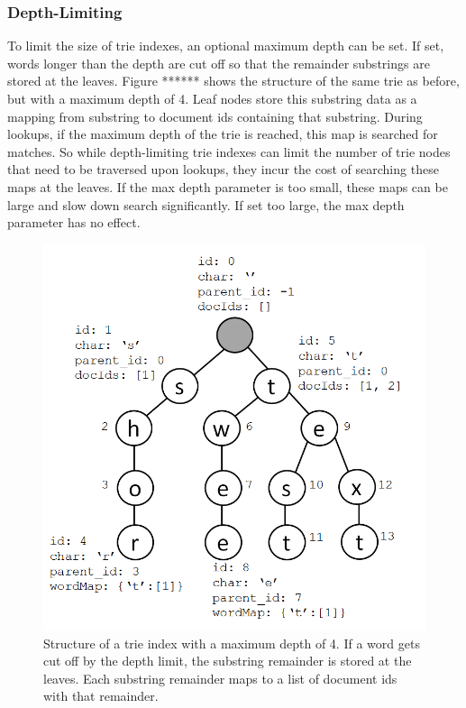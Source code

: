 \documentclass{vldb}
\begin{document}
\subsubsection{Depth-Limiting}
To limit the size of trie indexes, an optional maximum depth can be set. If set, words longer than the depth are cut off so that the remainder substrings are stored at the leaves. Figure ****** shows the structure of the same trie as before, but with a maximum depth of 4. Leaf nodes store this substring data as a mapping from substring to document ids containing that substring. During lookups, if the maximum depth of the trie is reached, this map is searched for matches. So while depth-limiting trie indexes can limit the number of trie nodes that need to be traversed upon lookups, they incur the cost of searching these maps at the leaves. If the max depth parameter is too small, these maps can be large and slow down search significantly. If set too large, the max depth parameter has no effect.

\begin{figure}[h!]
  \centering
   \includegraphics[scale=.35]{trie_maxdepth_figure}
  \caption{Structure of a trie index with a maximum depth of 4. If a word gets cut off by the depth limit, the substring remainder is stored at the leaves. Each substring remainder maps to a list of document ids with that remainder.}
\end{figure}
\end{document}
